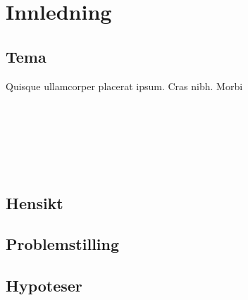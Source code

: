 \section{Innledning}

\subsection{Tema}

Quisque  ullamcorper  placerat  ipsum.  Cras  nibh.  Morbi  


\parencite{datatilsynet_personvern}\\
\parencite{regjeringen_personvern}\\
\parencite{regjeringen_gdpr}\\
\parencite{regjeringen_nylov}\\
\parencite{test}\\

\subsection{Hensikt}

\subsection{Problemstilling}

\subsection{Hypoteser}

\newpage